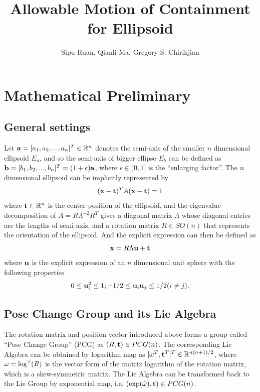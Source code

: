 \documentclass{article}
\author{Sipu Ruan, Qianli Ma, Gregory S. Chirikjian}
\title{Allowable Motion of Containment for Ellipsoid}
\begin{document}
\maketitle

\section{Mathematical Preliminary}
\subsection{General settings}
Let ${\bf a}=[a_1, a_2, ..., a_n]^T \in \mathbb{R}^n$ denotes the semi-axis of the smaller $n$ dimensional ellipsoid $E_a$, and so the semi-axis of bigger ellipse $E_b$ can be defined as ${\bf b}=[b_1,b_2, ..., b_n]^T=(1+\epsilon){\bf a}$, where $\epsilon \in (0,1]$ is the ``enlarging factor''. The $n$ dimensional ellipsoid can be implicitly represented by
\begin{equation}
({\bf x-t})^T A ({\bf x-t}) = 1 
\end{equation}
where ${\bf t} \in \mathbb{R}^n$ is the center position of the ellipsoid, and the eigenvalue decomposition of $A = R \Lambda^{-2} R^T$ gives a diagonal matrix $\Lambda$ whose diagonal entries are the lengths of semi-axis, and a rotation matrix $R \in SO(n)$ that represents the orientation of the ellipsoid. And the explicit expression can then be defined as
\begin{equation}
{\bf x} = R \Lambda {\bf u} + {\bf t}
\end{equation}
where ${\bf u}$ is the explicit expression of an $n$ dimensional unit sphere with the following properties
\begin{equation}
0 \leq {\bf u}_i^2 \leq 1; -1/2 \leq {\bf u}_i {\bf u}_j \leq 1/2 (i\neq j).
\end{equation}

\subsection{Pose Change Group and its Lie Algebra}
The rotation matrix and position vector introduced above forms a group called ``Pose Change Group'' (PCG) as $(R,{\bf t}) \in PCG(n)$. The corresponding Lie Algebra can be obtained by logarithm map as $[{\bf \omega}^T, {\bf t}^T]^T \in \mathbb{R}^{n(n+1)/2}$, where ${\bf \omega}=\log^\vee(R)$ is the vector form of the matrix logarithm of the rotation matrix, which is a skew-symmetric matrix. The Lie Algebra can be transformed back to the Lie Group by exponential map, i.e. $(\exp(\hat{\bf \omega}), {\bf t}) \in PCG(n)$.
\end{document}
